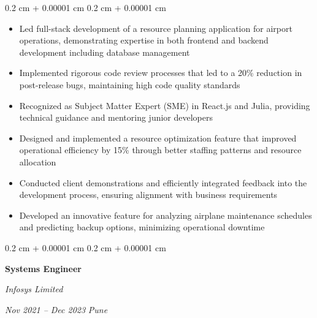 \documentclass[10pt, letterpaper]{article}
\newenvironment{highlights}{
    \begin{itemize}[
        topsep=0.10 cm,
        parsep=0.10 cm,
        partopsep=0pt,
        itemsep=0pt,
        leftmargin=0.4 cm + 10pt
    ]
}{
    \end{itemize}
}
\newenvironment{onecolentry}{
    \begin{adjustwidth}{
        0.2 cm + 0.00001 cm
    }{
        0.2 cm + 0.00001 cm
    }
}{
    \end{adjustwidth}
}
\newenvironment{twocolentry}[2][]{
    \onecolentry
    \def\secondColumn{#2}
    \setcolumnwidth{\fill, 4.5 cm}
    \begin{paracol}{2}
}{
    \switchcolumn \raggedleft \secondColumn
    \end{paracol}
    \endonecolentry
}
\begin{document}
        \vspace{0.10 cm}
        \begin{onecolentry}
            \begin{highlights}
                \item Led full-stack development of a resource planning application for airport operations, demonstrating expertise in both frontend and backend development including database management
                \item Implemented rigorous code review processes that led to a 20\% reduction in post-release bugs, maintaining high code quality standards
                \item Recognized as Subject Matter Expert (SME) in React.js and Julia, providing technical guidance and mentoring junior developers
                \item Designed and implemented a resource optimization feature that improved operational efficiency by 15\% through better staffing patterns and resource allocation
                \item Conducted client demonstrations and efficiently integrated feedback into the development process, ensuring alignment with business requirements
                \item Developed an innovative feature for analyzing airplane maintenance schedules and predicting backup options, minimizing operational downtime
            \end{highlights}
        \end{onecolentry}

        \vspace{0.2 cm}

        \begin{twocolentry}{
         \textit{Nov 2021 – Dec 2023}
        \textit{Pune}    }
       
            \textbf{Systems Engineer}
            
            \textit{Infosys Limited}
        \end{twocolentry}
\end{document}
